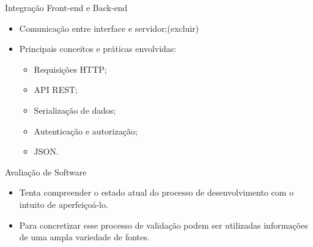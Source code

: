 \begin{frame}{Integração Front-end e Back-end}
    \begin{itemize}
        \item Comunicação entre interface e servidor;(excluir) \vspace{0.5cm}
        \item Principais conceitos e práticas envolvidas: \vspace{0.5cm}
              \begin{itemize}
                  \item Requisições HTTP; \vspace{0.25cm}
                  \item API REST; \vspace{0.25cm}
                  \item Serialização de dados; \vspace{0.25cm}
                  \item Autenticação e autorização; \vspace{0.25cm}
                  \item JSON. \vspace{0.25cm}
              \end{itemize}
    \end{itemize}
\end{frame}

\begin{frame}{Avaliação de Software}
    \begin{itemize}
        \item Tenta compreender o estado atual do processo de desenvolvimento com o intuito de aperfeiçoá-lo. \vspace{0.5cm}
        \item Para concretizar esse processo de validação podem ser utilizadas informações de uma ampla variedade de fontes. \vspace{0.5cm}
    \end{itemize}
\end{frame}
















